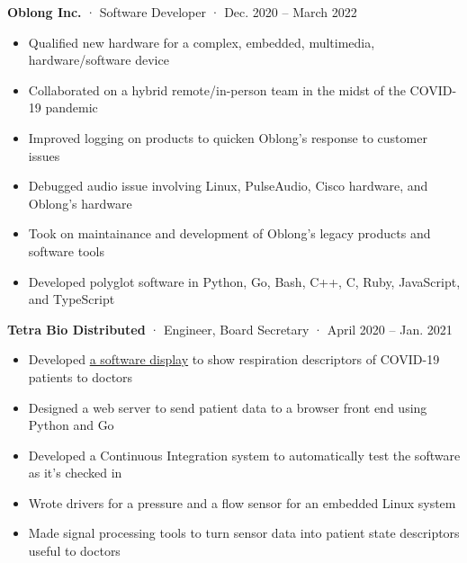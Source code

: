 \documentclass[12pt, oneside]{article}
\newcommand{\jobtitle}[3] {
	{\bf #1} · {#2} · {#3} \vspace{-7pt} \\
}
\begin{document}
\begin{flushleft}
\jobtitle{Oblong Inc.}{Software Developer}{Dec. 2020 – March 2022}
\begin{itemize}
	\item Qualified new hardware for a complex, embedded, multimedia, hardware/software device \\
	\item Collaborated on a hybrid remote/in-person team in the midst of the COVID-19 pandemic \\
	\item Improved logging on products to quicken Oblong's response to customer issues \\
	\item Debugged audio issue involving Linux, PulseAudio, Cisco hardware, and Oblong's hardware \\
	\item Took on maintainance and development of Oblong's legacy products and  software tools \\
	\item Developed polyglot software in Python, Go, Bash, C++, C, Ruby, JavaScript, and TypeScript \\
\end{itemize}

\jobtitle{Tetra Bio Distributed}{Engineer, Board Secretary}{April 2020 – Jan. 2021}
\begin{itemize}
	\item Developed \href{https://github.com/tetrabiodistributed/project-tetra-display}{a software display} to show respiration descriptors of COVID-19 patients to doctors \\
	\item Designed a web server to send patient data to a browser front end using Python and Go \\
	\item Developed a Continuous Integration system to automatically test the software as it's checked in \\
	\item Wrote drivers for a pressure and a flow sensor for an embedded Linux system \\
	\item Made signal processing tools to turn sensor data into patient state descriptors useful to doctors \\
\end{itemize}


\end{flushleft}
\end{document}
